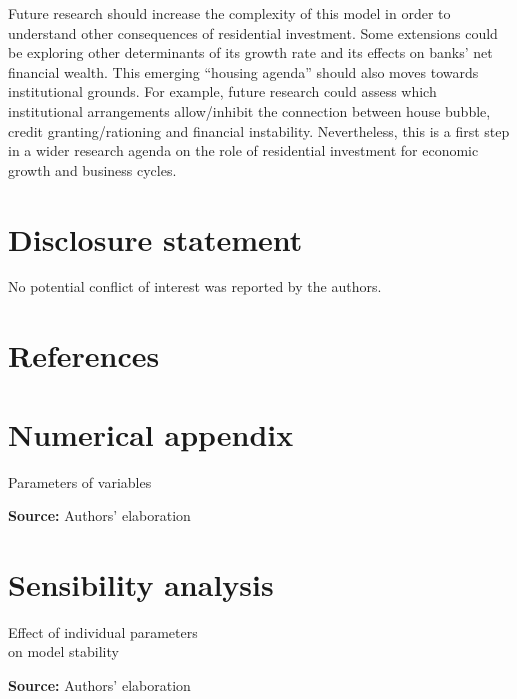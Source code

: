 \documentclass[12pt]{article}
\begin{document}
Future research should increase the complexity of this model in order to understand other consequences of residential investment.
Some extensions could be exploring other determinants of its growth rate and  its effects on banks' net financial wealth.
This emerging ``housing agenda'' should also moves towards institutional grounds.
For example, future research could assess which institutional arrangements allow/inhibit the connection between house bubble, credit granting/rationing and financial instability.
Nevertheless, this is a first step in a wider research agenda on the role of residential investment for economic growth and business cycles. 


\section*{Disclosure statement}
\label{sec:org867ef50}
No potential conflict of interest was reported by the authors.


\section*{References}
\label{sec:orgf457101}
\printbibliography[heading=none]


\appendix

\section{Numerical appendix}
\label{sec:org980f131}
\label{append:Data}


\begin{table}[H]
\caption{Parameters of variables}
\centering
\label{tab:param}

\caption*{\textbf{Source:} Authors' elaboration}
\end{table}

\section{Sensibility analysis}
\label{sec:org25a1757}
\label{append:Sensib}
\begin{table}[H]
\caption{Effect of individual parameters\\on model stability}
\label{tab:sensibility}
\centering

\caption*{\textbf{Source:} Authors' elaboration}
\end{table}
\end{document}
